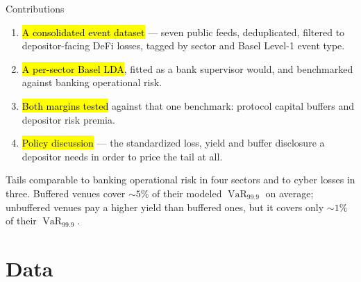 \documentclass[10pt,xcolor=x11names,aspectratio=169]{beamer}
\newcommand{\VaR}{\operatorname{VaR}}
\begin{document}
\begin{frame}{Contributions}
  \begin{enumerate}
    \item \hl{A consolidated event dataset} --- seven public feeds,
          deduplicated, filtered to depositor-facing DeFi losses, tagged by
          sector and Basel Level-1 event type.
    \item \hl{A per-sector Basel LDA}, fitted as a bank supervisor would, and
          benchmarked against banking operational risk.
    \item \hl{Both margins tested} against that one benchmark: protocol
          capital buffers and depositor risk premia.
    \item \hl{Policy discussion} --- the standardized loss, yield and
          buffer disclosure a depositor needs in order to price the tail
          at all.
  \end{enumerate}
  \begin{takeaway}[Headline]
    Tails comparable to banking operational risk in four sectors and to cyber
    losses in three. Buffered venues cover $\sim 5\%$ of their modeled
    $\VaR_{99.9}$ on average; unbuffered venues pay a higher yield than
    buffered ones, but it covers only $\sim 1\%$ of their $\VaR_{99.9}$.
  \end{takeaway}
\end{frame}

\section{Data}
\end{document}
